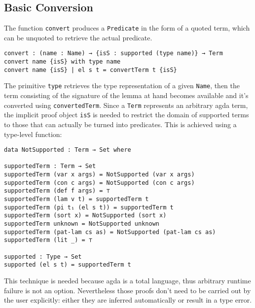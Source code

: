 \documentclass[10pt,a4paper]{article}
\begin{document}
\subsection{Basic Conversion}
The function \texttt{convert} produces a \texttt{Predicate} in the form of a quoted term, which can be unquoted to retrieve the actual predicate.
\begin{verbatim}
convert : (name : Name) → {isS : supported (type name)} → Term
convert name {isS} with type name
convert name {isS} | el s t = convertTerm t {isS}
\end{verbatim}
The primitive \texttt{type} retrieves the type representation of a given \texttt{Name}, then the term consisting of the signature of the lemma at hand becomes available and it's converted using \texttt{convertedTerm}.
Since a \texttt{Term} represents an arbitrary agda term, the implicit proof object \texttt{isS} is needed to restrict the domain of supported terms to those that can actually be turned into predicates. This is achieved using a type-level function:
\begin{verbatim}
data NotSupported : Term → Set where

supportedTerm : Term → Set
supportedTerm (var x args) = NotSupported (var x args)
supportedTerm (con c args) = NotSupported (con c args)
supportedTerm (def f args) = ⊤
supportedTerm (lam v t) = supportedTerm t
supportedTerm (pi t₁ (el s t)) = supportedTerm t 
supportedTerm (sort x) = NotSupported (sort x)
supportedTerm unknown = NotSupported unknown
supportedTerm (pat-lam cs as) = NotSupported (pat-lam cs as)
supportedTerm (lit _) = ⊤

supported : Type → Set
supported (el s t) = supportedTerm t
\end{verbatim}
This technique is needed because agda is a total language, thus arbitrary runtime failure is not an option. Nevertheless those proofs don't need to be carried out by the user explicitly: either they are inferred automatically or result in a type error.
\end{document}
